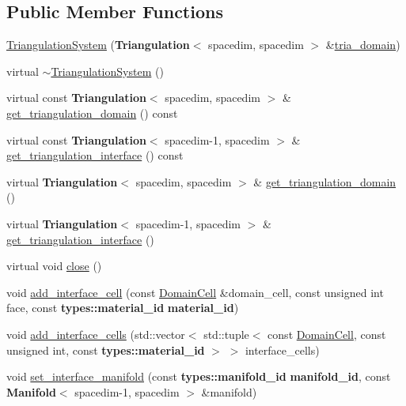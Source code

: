 \subsection*{Public Member Functions}
\begin{DoxyCompactItemize}
\item 
\hyperlink{class_triangulation_system_a427810bad1fb5457979b8948bb776539}{Triangulation\+System} ({\bf Triangulation}$<$ spacedim, spacedim $>$ \&\hyperlink{class_triangulation_system_a68bafddc70652cb7c64701c74e86279f}{tria\+\_\+domain})
\item 
virtual \hyperlink{class_triangulation_system_a9b0dc550fe1566ab1ba6668a868d0a70}{$\sim$\+Triangulation\+System} ()
\item 
virtual const {\bf Triangulation}$<$ spacedim, spacedim $>$ \& \hyperlink{class_triangulation_system_a38345fa4fb7725e66bf0762a1ef0b135}{get\+\_\+triangulation\+\_\+domain} () const 
\item 
virtual const {\bf Triangulation}$<$ spacedim-\/1, spacedim $>$ \& \hyperlink{class_triangulation_system_aa6615acfade0126dc55d168253c49c7c}{get\+\_\+triangulation\+\_\+interface} () const 
\item 
virtual {\bf Triangulation}$<$ spacedim, spacedim $>$ \& \hyperlink{class_triangulation_system_a4c4e1d0589f962d92532586d808c7da2}{get\+\_\+triangulation\+\_\+domain} ()
\item 
virtual {\bf Triangulation}$<$ spacedim-\/1, spacedim $>$ \& \hyperlink{class_triangulation_system_a73ef25cdc88395ef6d1ebcf6792cb97f}{get\+\_\+triangulation\+\_\+interface} ()
\item 
virtual void \hyperlink{class_triangulation_system_ad3605f3f59fbd55942288026107c4e6d}{close} ()
\item 
void \hyperlink{class_triangulation_system_a004ced64c3160c7589b6e7bf12f58019}{add\+\_\+interface\+\_\+cell} (const \hyperlink{class_triangulation_system_af53de5ec80a16d9cb167660b2832b240}{Domain\+Cell} \&domain\+\_\+cell, const unsigned int face, const {\bf types\+::material\+\_\+id} {\bf material\+\_\+id})
\item 
void \hyperlink{class_triangulation_system_a2bb42253dc27cab092c7c76c66b83585}{add\+\_\+interface\+\_\+cells} (std\+::vector$<$ std\+::tuple$<$ const \hyperlink{class_triangulation_system_af53de5ec80a16d9cb167660b2832b240}{Domain\+Cell}, const unsigned int, const {\bf types\+::material\+\_\+id} $>$ $>$ interface\+\_\+cells)
\item 
void \hyperlink{class_triangulation_system_a54803f193d6f237b2039ba6f5bca09b9}{set\+\_\+interface\+\_\+manifold} (const {\bf types\+::manifold\+\_\+id} {\bf manifold\+\_\+id}, const {\bf Manifold}$<$ spacedim-\/1, spacedim $>$ \&manifold)

\end{DoxyCompactItemize}
